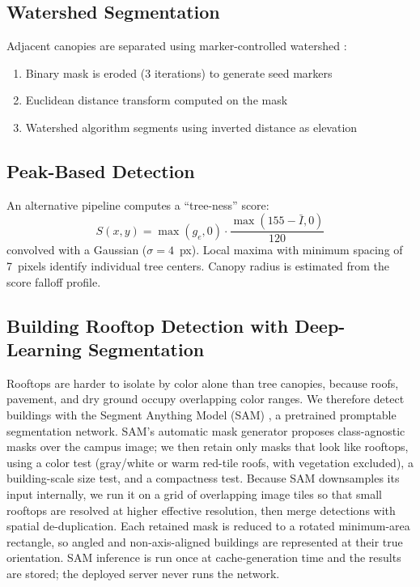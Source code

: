 \documentclass[11pt]{article}
\begin{document}
\subsection{Watershed Segmentation}

Adjacent canopies are separated using marker-controlled watershed \citep{beucher1992}:
\begin{enumerate}
    \item Binary mask is eroded (3 iterations) to generate seed markers
    \item Euclidean distance transform computed on the mask
    \item Watershed algorithm segments using inverted distance as elevation
\end{enumerate}

\subsection{Peak-Based Detection}

An alternative pipeline computes a ``tree-ness'' score:
\begin{equation}
S(x,y) = \max(g_e, 0) \cdot \frac{\max(155 - \bar{I}, 0)}{120}
\end{equation}
convolved with a Gaussian ($\sigma = 4$~px). Local maxima with minimum spacing of 7~pixels identify individual tree centers. Canopy radius is estimated from the score falloff profile.

\subsection{Building Rooftop Detection with Deep-Learning Segmentation}
\label{sec:buildings}

Rooftops are harder to isolate by color alone than tree canopies, because roofs, pavement, and dry ground occupy overlapping color ranges. We therefore detect buildings with the Segment Anything Model (SAM) \citep{kirillov2023}, a pretrained promptable segmentation network. SAM's automatic mask generator proposes class-agnostic masks over the campus image; we then retain only masks that look like rooftops, using a color test (gray/white or warm red-tile roofs, with vegetation excluded), a building-scale size test, and a compactness test. Because SAM downsamples its input internally, we run it on a grid of overlapping image tiles so that small rooftops are resolved at higher effective resolution, then merge detections with spatial de-duplication. Each retained mask is reduced to a rotated minimum-area rectangle, so angled and non-axis-aligned buildings are represented at their true orientation. SAM inference is run once at cache-generation time and the results are stored; the deployed server never runs the network.
\end{document}
